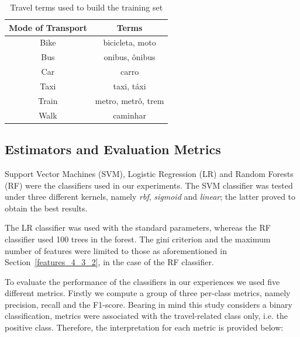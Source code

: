 \begin{table}[!htbp]
\centering
\caption{Travel terms used to build the training set}
\label{terms}
\begin{tabular}{c|c}
\hline
\textbf{Mode of Transport} & \textbf{Terms} \\ \hline
Bike & bicicleta, moto \\
Bus & onibus, ônibus \\
Car & carro \\
Taxi & taxi, táxi \\
Train & metro, metrô, trem \\
Walk & caminhar \\ \hline
\end{tabular}
\end{table}

\subsection{Estimators and Evaluation Metrics}
Support Vector Machines (SVM), Logistic Regression (LR) and Random Forests (RF) were the classifiers used in our experiments. The SVM classifier was tested under three different kernels, namely \textit{rbf}, \textit{sigmoid} and \textit{linear}; the latter proved to obtain the best results. 

The LR classifier was used with the standard parameters, whereas the RF classifier used 100 trees in the forest. The gini criterion and the maximum number of features were limited to those as aforementioned in Section~\ref{features_4_3_2}, in the case of the RF classifier.

To evaluate the performance of the classifiers in our experiences we used five different metrics. Firstly we compute a group of three per-class metrics, namely precision, recall and the F1-score. Bearing in mind this study considers a binary classification, metrics were associated with the travel-related class only, i.e. the positive class. Therefore, the interpretation for each metric is provided below:

